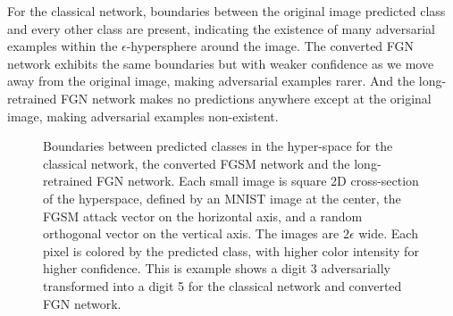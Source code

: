 \documentclass[12pt,oneside]{CUNY_PhD}
\begin{document}
For the classical network, boundaries between the original image predicted class and every other class are present, indicating the existence of many adversarial examples within the $\epsilon$-hypersphere around the image. The converted FGN network exhibits the same boundaries but with weaker confidence as we move away from the original image, making adversarial examples rarer. And the long-retrained FGN network makes no predictions anywhere except at the original image, making adversarial examples non-existent.
\begin{figure}[!t]
    \centering
    \caption{Boundaries between predicted classes in the hyper-space for the classical network, the converted FGSM network and the long-retrained FGN network. Each small image is square 2D cross-section of the hyperspace, defined by an MNIST image at the center, the FGSM attack vector on the horizontal axis, and a random orthogonal vector on the vertical axis. The images are $2\epsilon$ wide. Each pixel is colored by the predicted class, with higher color intensity for higher confidence. This is example shows a digit 3 adversarially transformed into a digit 5 for the classical network and converted FGN network.\protect\footnotemark}
    \label{fig:fgsm-bounds}
\end{figure}
\end{document}
